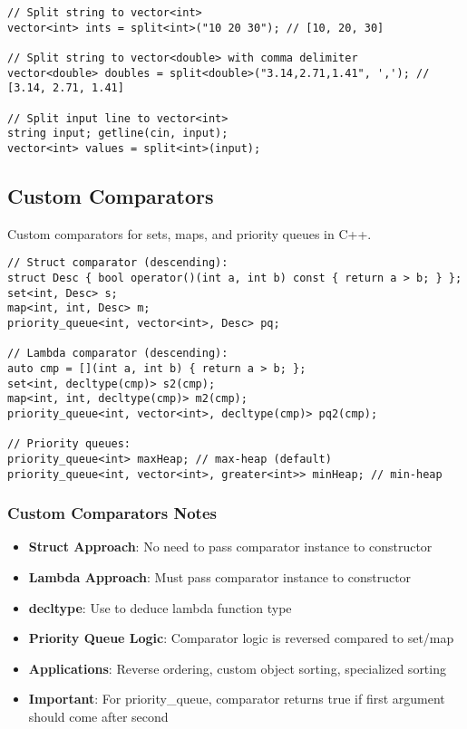 \documentclass[11pt,a4paper]{article}
\begin{document}
\begin{lstlisting}[caption={String Split Examples}]
// Split string to vector<int>
vector<int> ints = split<int>("10 20 30"); // [10, 20, 30]

// Split string to vector<double> with comma delimiter
vector<double> doubles = split<double>("3.14,2.71,1.41", ','); // [3.14, 2.71, 1.41]

// Split input line to vector<int>
string input; getline(cin, input);
vector<int> values = split<int>(input);
\end{lstlisting}



\newpage

\subsection{Custom Comparators}
Custom comparators for sets, maps, and priority queues in C++.

\begin{lstlisting}[caption={Custom Comparator Approaches}]
// Struct comparator (descending):
struct Desc { bool operator()(int a, int b) const { return a > b; } };
set<int, Desc> s; 
map<int, int, Desc> m; 
priority_queue<int, vector<int>, Desc> pq;

// Lambda comparator (descending):
auto cmp = [](int a, int b) { return a > b; };
set<int, decltype(cmp)> s2(cmp);
map<int, int, decltype(cmp)> m2(cmp);
priority_queue<int, vector<int>, decltype(cmp)> pq2(cmp);

// Priority queues:
priority_queue<int> maxHeap; // max-heap (default)
priority_queue<int, vector<int>, greater<int>> minHeap; // min-heap
\end{lstlisting}

\subsubsection*{Custom Comparators Notes}
\begin{itemize}
\item \textbf{Struct Approach}: No need to pass comparator instance to constructor
\item \textbf{Lambda Approach}: Must pass comparator instance to constructor
\item \textbf{decltype}: Use to deduce lambda function type
\item \textbf{Priority Queue Logic}: Comparator logic is reversed compared to set/map
\item \textbf{Applications}: Reverse ordering, custom object sorting, specialized sorting
\item \textbf{Important}: For priority\_queue, comparator returns true if first argument should come after second
\end{itemize}
\end{document}

